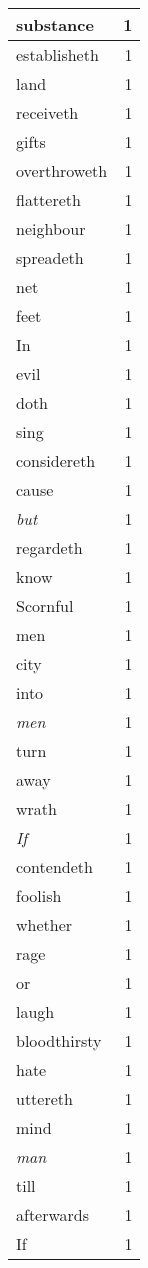\begin{center}
\begin{longtable}{l|r}
substance & 1\\ \hline 
establisheth & 1\\ \hline 
land & 1\\ \hline 
receiveth & 1\\ \hline 
gifts & 1\\ \hline 
overthroweth & 1\\ \hline 
flattereth & 1\\ \hline 
neighbour & 1\\ \hline 
spreadeth & 1\\ \hline 
net & 1\\ \hline 
feet & 1\\ \hline 
In & 1\\ \hline 
evil & 1\\ \hline 
doth & 1\\ \hline 
sing & 1\\ \hline 
considereth & 1\\ \hline 
cause & 1\\ \hline 
\emph{but} & 1\\ \hline 
regardeth & 1\\ \hline 
know & 1\\ \hline 
Scornful & 1\\ \hline 
men & 1\\ \hline 
city & 1\\ \hline 
into & 1\\ \hline 
\emph{men} & 1\\ \hline 
turn & 1\\ \hline 
away & 1\\ \hline 
wrath & 1\\ \hline 
\emph{If} & 1\\ \hline 
contendeth & 1\\ \hline 
foolish & 1\\ \hline 
whether & 1\\ \hline 
rage & 1\\ \hline 
or & 1\\ \hline 
laugh & 1\\ \hline 
bloodthirsty & 1\\ \hline 
hate & 1\\ \hline 
uttereth & 1\\ \hline 
mind & 1\\ \hline 
\emph{man} & 1\\ \hline 
till & 1\\ \hline 
afterwards & 1\\ \hline 
If & 1\\ \hline 

\end{longtable}
\end{center}
